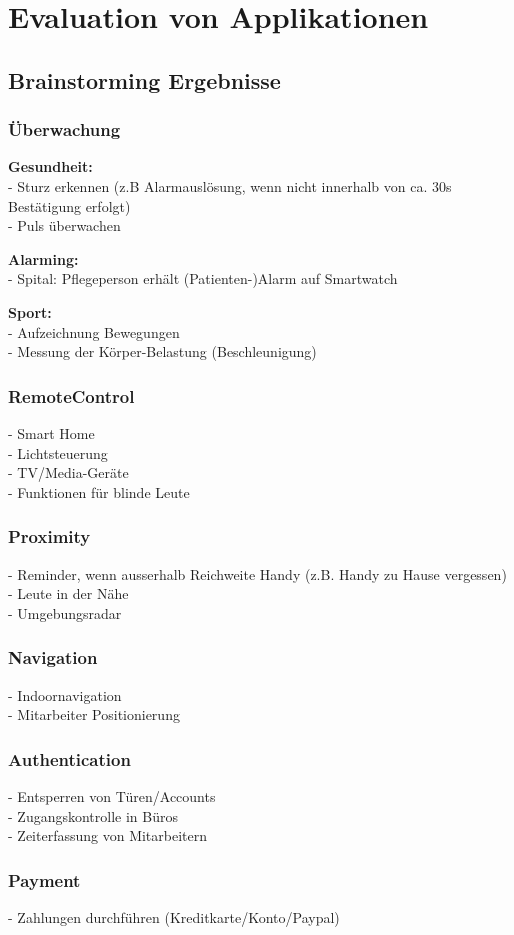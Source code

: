 \chapter{Evaluation von Applikationen}
\section{Brainstorming Ergebnisse}
\subsection{Überwachung}
\textbf{Gesundheit:}\\
- Sturz erkennen {(z.B Alarmauslösung, wenn nicht innerhalb von ca. 30s Bestätigung erfolgt)}\\
- Puls überwachen

\textbf{Alarming:}\\
- Spital: Pflegeperson erhält {(Patienten-)}Alarm auf Smartwatch

\textbf{Sport:}\\
- Aufzeichnung Bewegungen\\
- Messung der Körper-Belastung {(Beschleunigung)}

\subsection{RemoteControl}
- Smart  Home\\
- Lichtsteuerung\\
- TV/Media-Geräte\\
- Funktionen für blinde Leute

\subsection{Proximity}
- Reminder{,} wenn ausserhalb Reichweite Handy {(z.B. Handy zu Hause vergessen)}\\
- Leute in der Nähe\\
- Umgebungsradar

\subsection{Navigation}
- Indoornavigation\\
- Mitarbeiter Positionierung

\subsection{Authentication}
- Entsperren von Türen/Accounts\\
- Zugangskontrolle in Büros\\
- Zeiterfassung von Mitarbeitern

\subsection{Payment}
- Zahlungen durchführen {(Kreditkarte/Konto/Paypal)}

\newpage
